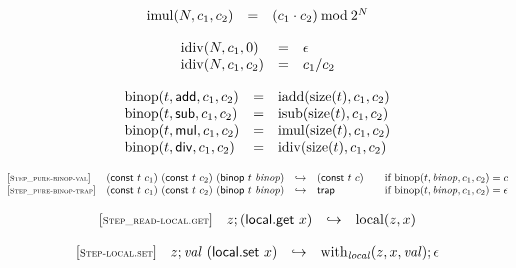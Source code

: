 \documentclass{article}
\begin{document}
$$
\begin{array}{@{}lcl@{}l@{}}
	{\mathrm{imul}}(N, c_1, c_2) &=& (c_1 \cdot c_2) \mathbin{\mathrm{mod}} {2^{N}} \\
\end{array}
$$

$$
\begin{array}{@{}lcl@{}l@{}}
	{\mathrm{idiv}}(N, c_1, 0) &=& \epsilon \\
	{\mathrm{idiv}}(N, c_1, c_2) &=& c_1 / c_2 \\
\end{array}
$$

$$
\begin{array}{@{}lcl@{}l@{}}
	{\mathrm{binop}}(t, \mathsf{add}, c_1, c_2) &=& {\mathrm{iadd}}({\mathrm{size}}(t), c_1, c_2) \\
	{\mathrm{binop}}(t, \mathsf{sub}, c_1, c_2) &=& {\mathrm{isub}}({\mathrm{size}}(t), c_1, c_2) \\
	{\mathrm{binop}}(t, \mathsf{mul}, c_1, c_2) &=& {\mathrm{imul}}({\mathrm{size}}(t), c_1, c_2) \\
	{\mathrm{binop}}(t, \mathsf{div}, c_1, c_2) &=& {\mathrm{idiv}}({\mathrm{size}}(t), c_1, c_2) \\
\end{array}
$$

$$
\begin{array}{@{}l@{}rcl@{}l@{}}
	{[\textsc{\scriptsize Step\_pure{-}binop{-}val}]} \quad & (\mathsf{const}~t~c_1)~(\mathsf{const}~t~c_2)~(\mathsf{binop}~t~{\mathit{binop}}) &\hookrightarrow& (\mathsf{const}~t~c)
	&\qquad \mbox{if}~{\mathrm{binop}}(t, {\mathit{binop}}, c_1, c_2) = c \\
	{[\textsc{\scriptsize Step\_pure{-}binop{-}trap}]} \quad & (\mathsf{const}~t~c_1)~(\mathsf{const}~t~c_2)~(\mathsf{binop}~t~{\mathit{binop}}) &\hookrightarrow& \mathsf{trap}
	&\qquad \mbox{if}~{\mathrm{binop}}(t, {\mathit{binop}}, c_1, c_2) = \epsilon \\
\end{array}
$$

\vspace{1ex}

$$
\begin{array}{@{}l@{}rcl@{}l@{}}
	{[\textsc{\scriptsize Step\_read{-}local.get}]} \quad & z ; (\mathsf{local.get}~x) &\hookrightarrow& {\mathrm{local}}(z, x) \\
\end{array}
$$

$$
\begin{array}{@{}l@{}rcl@{}l@{}}
	{[\textsc{\scriptsize Step{-}local.set}]} \quad & z ; {\mathit{val}}~(\mathsf{local.set}~x) &\hookrightarrow& {\mathrm{with}}_{\mathit{local}}(z, x, {\mathit{val}}) ; \epsilon \\
\end{array}
$$
\end{document}

